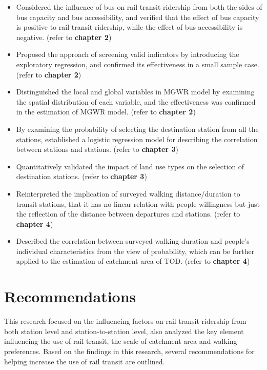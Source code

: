 \begin{itemize}
	\item Considered the influence of bus on rail transit ridership from both the sides of bus capacity and bus accessibility, and verified that the effect of bus capacity is positive to rail transit ridership, while the effect of bus accessibility is negative. (refer to \textbf{chapter 2})
	
	\item Proposed the approach of screening valid indicators by introducing the exploratory regression, and confirmed its effectiveness in a small sample case. (refer to \textbf{chapter 2})
	
	\item Distinguished the local and global variables in MGWR model by examining the spatial distribution of each variable, and the effectiveness was confirmed in the estimation of MGWR model. (refer to \textbf{chapter 2})
	
	\item By examining the probability of selecting the destination station from all the stations, established a logistic regression model for describing the correlation between stations and stations. (refer to \textbf{chapter 3})
	
	\item Quantitatively validated the impact of land use types on the selection of destination stations. (refer to \textbf{chapter 3})
	
	\item Reinterpreted the implication of surveyed walking distance/duration to transit stations, that it has no linear relation with people willingness but just the reflection of the distance between departures and stations. (refer to \textbf{chapter 4})
	
	\item Described the correlation between surveyed walking duration and people's individual characteristics from the view of probability, which can be further applied to the estimation of catchment area of TOD. (refer to \textbf{chapter 4})
	
\end{itemize} 

\section{Recommendations}
This research focused on the influencing factors on rail transit ridership from both station level and station-to-station level, also analyzed the key element influencing the use of rail transit, the scale of catchment area and walking preferences. Based on the findings in this research, several recommendations for helping increase the use of rail transit are outlined.

